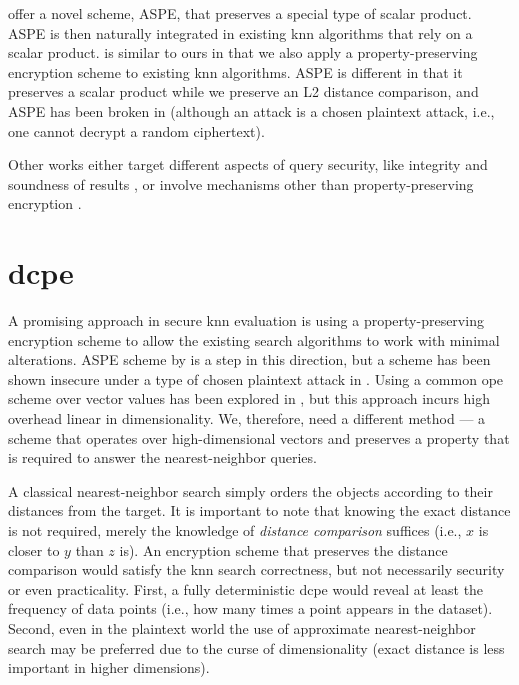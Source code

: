 		\textcite{knn-aspe} offer a novel scheme, ASPE, that preserves a special type of scalar product.
		ASPE is then naturally integrated in existing \acrshort{knn} algorithms that rely on a scalar product.
		\cite{knn-aspe} is similar to ours in that we also apply a property-preserving encryption scheme to existing \acrshort{knn} algorithms.
		ASPE is different in that it preserves a scalar product while we preserve an L2 distance comparison, and ASPE has been broken in \cite{secure-nn-revisited-break-aspe} (although an attack is a chosen plaintext attack, i.e., one cannot decrypt a random ciphertext).

		Other works either target different aspects of query security, like integrity and soundness of results \cite{knn-integrity-soundness,svknn}, or involve mechanisms other than property-preserving encryption \cite{seceqp,practical-approx-knn,knn-sharing-keys,knn-mult-data-owners,knn-over-encrypted,knn-paillier,knn-blind,knn-homomorphism,knn-strong-location-privacy,knn-no-anonymizers,knn-efficient,knn-new-casper}.

	\section{\texorpdfstring{\acrlong{dcpe}}{Distance Comparison Preserving Encryption}}

		A promising approach in secure \acrshort{knn} evaluation is using a property-preserving encryption scheme to allow the existing search algorithms to work with minimal alterations.
		ASPE scheme by \textcite{knn-aspe} is a step in this direction, but a scheme has been shown insecure under a type of chosen plaintext attack in \cite{secure-nn-revisited-break-aspe}.
		Using a common \acrshort{ope} scheme over vector values has been explored in \cite{quick-n}, but this approach incurs high overhead linear in dimensionality.
		We, therefore, need a different method --- a scheme that operates over high-dimensional vectors and preserves a property that is required to answer the nearest-neighbor queries.

		A classical nearest-neighbor search \cite{knn-wong,knn-cunningham} simply orders the objects according to their distances from the target.
		It is important to note that knowing the exact distance is not required, merely the knowledge of \emph{distance comparison} suffices (i.e., $x$ is closer to $y$ than $z$ is).
		An encryption scheme that preserves the distance comparison would satisfy the \acrshort{knn} search correctness, but not necessarily security or even practicality.
		First, a fully deterministic \acrfull{dcpe} would reveal at least the frequency of data points (i.e., how many times a point appears in the dataset).
		Second, even in the plaintext world the use of approximate nearest-neighbor search \cite{scalable-nn,approximate-nn-fixed-d} may be preferred due to the curse of dimensionality \cite{nn-meaningful,nn-curse-of-d} (exact distance is less important in higher dimensions).

